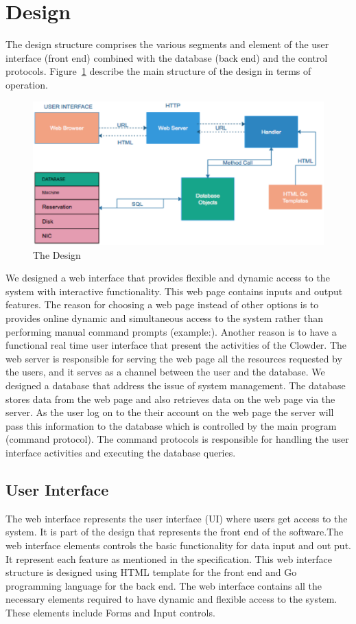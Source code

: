 \section{Design}
The design structure comprises the various  segments and element of the user interface (front end) combined with the database (back end)  and the control protocols. Figure~\ref{fig:Design} describe the main structure of the design in terms of operation.
\begin{figure}[h]
  \includegraphics[width=\linewidth]{Design.eps}
  \caption{The Design}
  \label{fig:Design}
\end{figure}
\pagebreak
We designed a web interface that provides  flexible and dynamic access to the system with interactive functionality. This web page contains inputs and output features. The reason for choosing a web page instead of other options is to provides online dynamic and simultaneous  access to the system rather than performing manual command prompts (example:). Another reason is to have a functional real time user interface that present the activities of the Clowder. The web server is responsible for serving the web page all the resources requested by the users, and it serves as a channel between the user and the database. We designed a database that address the issue of system management. The database stores data from the web page and also retrieves data on the web page via the server. As the user log on to the their account on the web page the server will pass this information to the  database which is controlled by the main program (command protocol). The command protocols is responsible for handling the user interface activities and executing the database queries.  

\subsection{User Interface}
The web interface represents the user interface (UI) where users get access to the system. It is part of the design that represents the front end of the software.The web interface elements controls the basic functionality for data input and out put. It represent each feature as mentioned in the specification. This web interface structure is designed using  HTML template for the front end and Go programming language for the back end. 
The web interface contains all the necessary elements required to have dynamic and flexible access to the system. These elements include Forms and Input controls.
